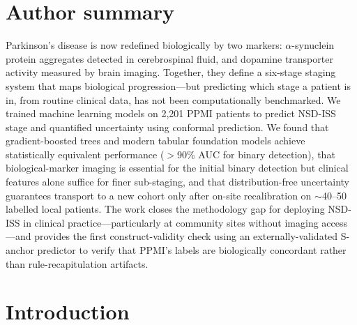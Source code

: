 \documentclass[10pt,letterpaper]{article}
\begin{document}
\section*{Author summary}
Parkinson's disease is now redefined biologically by two markers: $\alpha$-synuclein protein aggregates detected in cerebrospinal fluid, and dopamine transporter activity measured by brain imaging. Together, they define a six-stage staging system that maps biological progression---but predicting which stage a patient is in, from routine clinical data, has not been computationally benchmarked. We trained machine learning models on 2,201 PPMI patients to predict NSD-ISS stage and quantified uncertainty using conformal prediction. We found that gradient-boosted trees and modern tabular foundation models achieve statistically equivalent performance ($>$90\% AUC for binary detection), that biological-marker imaging is essential for the initial binary detection but clinical features alone suffice for finer sub-staging, and that distribution-free uncertainty guarantees transport to a new cohort only after on-site recalibration on $\sim$40--50 labelled local patients. The work closes the methodology gap for deploying NSD-ISS in clinical practice---particularly at community sites without imaging access---and provides the first construct-validity check using an externally-validated S-anchor predictor to verify that PPMI's labels are biologically concordant rather than rule-recapitulation artifacts.

\clearpage
{}
\linenumbers



\section*{Introduction}
\label{p1:sec:introduction}
\end{document}
